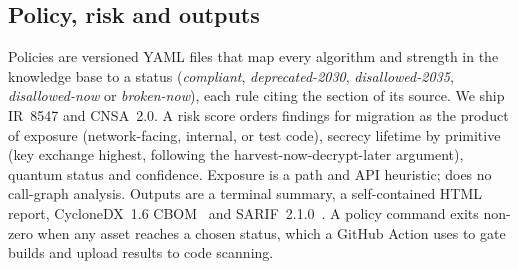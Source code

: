 \subsection{Policy, risk and outputs}

Policies are versioned YAML files that map every algorithm and strength in the
knowledge base to a status (\emph{compliant}, \emph{deprecated-2030},
\emph{disallowed-2035}, \emph{disallowed-now} or \emph{broken-now}), each rule
citing the section of its source. We ship IR~8547 and CNSA~2.0. A risk score
orders findings for migration as the product of exposure (network-facing,
internal, or test code), secrecy lifetime by primitive (key exchange highest,
following the harvest-now-decrypt-later argument), quantum status and
confidence. Exposure is a path and API heuristic; \tool{} does no call-graph
analysis. Outputs are a terminal summary, a self-contained HTML report,
CycloneDX~1.6 CBOM~\cite{cyclonedx} and SARIF~2.1.0~\cite{sarif}. A policy
command exits non-zero when any asset reaches a chosen status, which a
GitHub Action uses to gate builds and upload results to code scanning.
